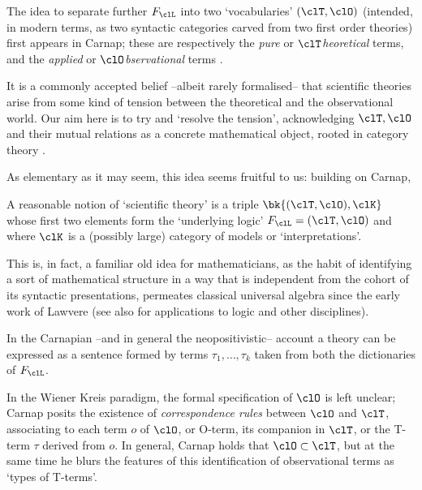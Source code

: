 The idea to separate further $F_\clL$ into two `vocabularies' $(\clT,\clO)$ (intended, in modern terms, as two syntactic categories carved from two first order theories) first appears in Carnap; these are respectively the \emph{pure} or $\clT$\emph{heoretical} terms, and the \emph{applied} or $\clO$\emph{bservational} terms \cite{carnap56}.

It is a commonly accepted belief --albeit rarely formalised-- that scientific theories arise from some kind of tension between the theoretical and the observational world. Our aim here is to try and `resolve the tension', acknowledging $\clT,\clO$ and their mutual relations as a concrete mathematical object, rooted in category theory \cite{McL,pedicchiofoundations,riehlcontext,leinster2014basic}.

As elementary as it may seem, this idea seems fruitful to us: building on Carnap,
\begin{remark*}
  A reasonable notion of `scientific theory' is a triple $\bk{(\clT,\clO), \clK}$ whose first two elements form the `underlying logic' $F_\clL=(\clT,\clO)$ and where $\clK$ is a (possibly large) category of models or `interpretations'.
\end{remark*}
This is, in fact, a familiar old idea for mathematicians, as the habit of identifying a sort of mathematical structure in a way that is independent from the cohort of its syntactic presentations, permeates classical universal algebra since the early work of Lawvere \cite{lawvere1963functorial,lawvere1996unity} (see also \cite{abramskyno,Borceux1994,makkai1989accessible} for applications to logic and other disciplines).

In the Carnapian --and in general the neopositivistic-- account a theory can be expressed as a sentence formed by terms $\tau_1, \dots, \tau_k$ taken from both the dictionaries of $F_\clL$.

In the Wiener Kreis paradigm, the formal specification of $\clO$ is left unclear; Carnap \cite{carnapfound} posits the existence of \emph{correspondence rules} between $\clO$ and $\clT$, associating to each term $o$ of $\clO$, or O-term, its companion in $\clT$, or the T-term $\tau$ derived from $o$. In general, Carnap holds that $\clO \subset \clT$, but at the same time he blurs the features of this identification of observational terms as `types of T-terms'.

